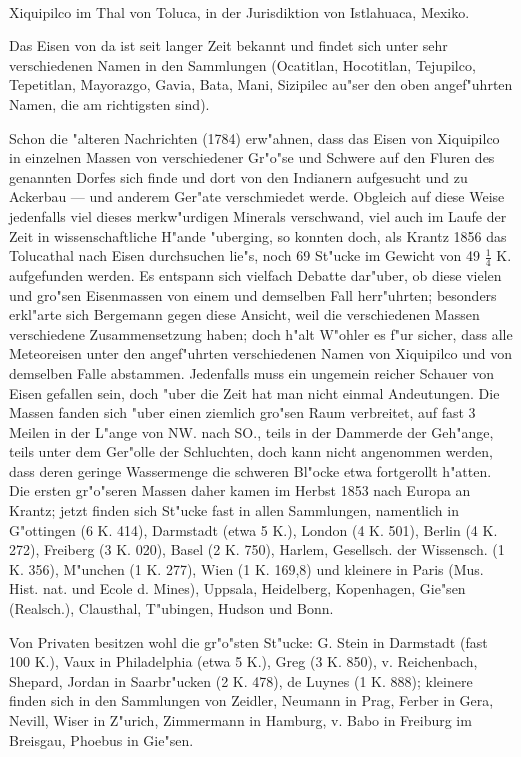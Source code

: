 \documentclass[a4paper, 11pt, oneside]{article}
\begin{document}
\paragraph{}
Xiquipilco im Thal von Toluca, in der Jurisdiktion von Istlahuaca, Mexiko.

Das Eisen von da ist seit langer Zeit bekannt und findet sich unter sehr verschiedenen Namen in den Sammlungen (Ocatitlan, Hocotitlan, Tejupilco, Tepetitlan, Mayorazgo, Gavia, Bata, Mani, Sizipilec au"ser den oben angef"uhrten Namen, die am richtigsten sind).

Schon die "alteren Nachrichten (1784) erw"ahnen, dass das Eisen von Xiquipilco in einzelnen Massen von verschiedener Gr"o"se und Schwere auf den Fluren des genannten Dorfes sich finde und dort von den Indianern aufgesucht und zu Ackerbau --- und anderem Ger"ate verschmiedet werde. Obgleich auf diese Weise jedenfalls viel dieses merkw"urdigen Minerals verschwand, viel auch im Laufe der Zeit in wissenschaftliche H"ande "uberging, so konnten doch, als Krantz 1856 das Tolucathal nach Eisen durchsuchen lie"s, noch 69 St"ucke im Gewicht von 49 $\frac{1}{4}$ K. aufgefunden werden. Es entspann sich vielfach Debatte dar"uber, ob diese vielen und gro"sen Eisenmassen von einem und demselben Fall herr"uhrten; besonders erkl"arte sich Bergemann gegen diese Ansicht, weil die verschiedenen Massen verschiedene Zusammensetzung haben; doch h"alt W"ohler es f"ur sicher, dass alle Meteoreisen unter den angef"uhrten verschiedenen Namen von Xiquipilco und von demselben Falle abstammen. Jedenfalls muss ein ungemein reicher Schauer von Eisen gefallen sein, doch "uber die Zeit hat man nicht einmal Andeutungen. Die Massen fanden sich "uber einen ziemlich gro"sen Raum verbreitet, auf fast 3 Meilen in der L"ange von NW. nach SO., teils in der Dammerde der Geh"ange, teils unter dem Ger"olle der Schluchten, doch kann nicht angenommen werden, dass deren geringe Wassermenge die schweren Bl"ocke etwa fortgerollt h"atten. Die ersten gr"o"seren Massen daher kamen im Herbst 1853 nach Europa an Krantz; jetzt finden sich St"ucke fast in allen Sammlungen, namentlich in G"ottingen (6 K. 414), Darmstadt (etwa 5 K.), London (4 K. 501), Berlin (4 K. 272), Freiberg (3 K. 020), Basel (2 K. 750), Harlem, Gesellsch. der Wissensch. (1 K. 356), M"unchen (1 K. 277), Wien (1 K. 169,8) und kleinere in Paris (Mus. Hist. nat. und Ecole d. Mines), Uppsala, Heidelberg, Kopenhagen, Gie"sen (Realsch.), Clausthal, T"ubingen, Hudson und Bonn.

Von Privaten besitzen wohl die gr"o"sten St"ucke: G. Stein in Darmstadt (fast 100 K.), Vaux in Philadelphia (etwa 5 K.), Greg (3 K. 850), v. Reichenbach, Shepard, Jordan in Saarbr"ucken (2 K. 478), de Luynes (1 K. 888); kleinere finden sich in den Sammlungen von Zeidler, Neumann in Prag, Ferber in Gera, Nevill, Wiser in Z"urich, Zimmermann in Hamburg, v. Babo in Freiburg im Breisgau, Phoebus in Gie"sen.
\end{document}
